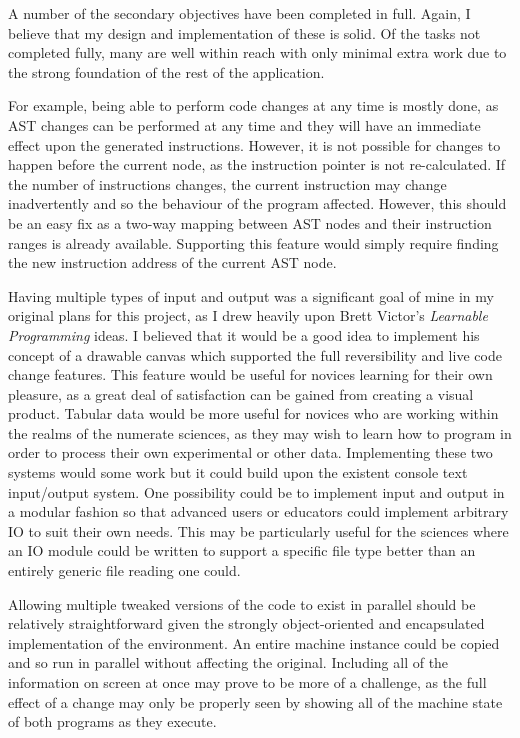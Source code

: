 A number of the secondary objectives have been completed in full. Again, I believe that my design and implementation of these is solid. Of the tasks not completed fully, many are well within reach with only minimal extra work due to the strong foundation of the rest of the application.

For example, being able to perform code changes at any time is mostly done, as AST changes can be performed at any time and they will have an immediate effect upon the generated instructions. However, it is not possible for changes to happen before the current node, as the instruction pointer is not re-calculated. If the number of instructions changes, the current instruction may change inadvertently and so the behaviour of the program affected. However, this should be an easy fix as a two-way mapping between AST nodes and their instruction ranges is already available. Supporting this feature would simply require finding the new instruction address of the current AST node.

Having multiple types of input and output was a significant goal of mine in my original plans for this project, as I drew heavily upon Brett Victor's \textit{Learnable Programming} ideas. I believed that it would be a good idea to implement his concept of a drawable canvas which supported the full reversibility and live code change features. This feature would be useful for novices learning for their own pleasure, as a great deal of satisfaction can be gained from creating a visual product. Tabular data would be more useful for novices who are working within the realms of the numerate sciences, as they may wish to learn how to program in order to process their own experimental or other data. Implementing these two systems would some work but it could build upon the existent console text input/output system. One possibility could be to implement input and output in a modular fashion so that advanced users or educators could implement arbitrary IO to suit their own needs. This may be particularly useful for the sciences where an IO module could be written to support a specific file type better than an entirely generic file reading one could.

Allowing multiple tweaked versions of the code to exist in parallel should be relatively straightforward given the strongly object-oriented and encapsulated implementation of the environment. An entire machine instance could be copied and so run in parallel without affecting the original. Including all of the information on screen at once may prove to be more of a challenge, as the full effect of a change may only be properly seen by showing all of the machine state of both programs as they execute.

